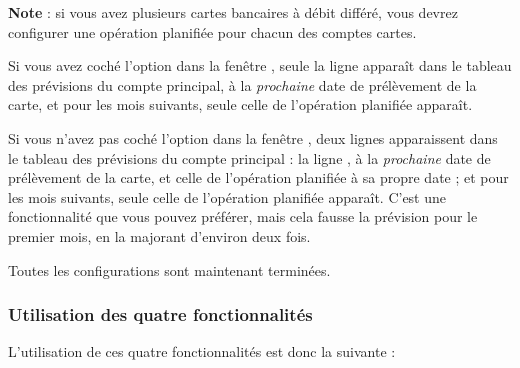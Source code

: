 \textbf{Note} : si vous avez plusieurs cartes bancaires à débit différé, vous devrez configurer une opération planifiée pour chacun des comptes cartes.

Si vous avez coché l'option  dans la fenêtre , seule la ligne  apparaît dans le tableau des prévisions du compte principal, à la \emph{prochaine} date de prélèvement de la carte, et pour les mois suivants, seule celle de l'opération planifiée apparaît.
		
Si vous n'avez pas coché l'option  dans la fenêtre , deux lignes apparaissent dans le tableau des prévisions du compte principal : la ligne , à la \emph{prochaine} date de prélèvement de la carte, et celle de l'opération planifiée à sa propre date ; et pour les mois suivants, seule celle de l'opération planifiée apparaît. C'est une fonctionnalité que vous pouvez préférer, mais cela fausse la prévision pour le premier mois, en la majorant d'environ deux fois.

Toutes les configurations sont maintenant terminées.



\subsubsection{Utilisation des quatre fonctionnalités}


L'utilisation de ces quatre fonctionnalités est donc la suivante :

